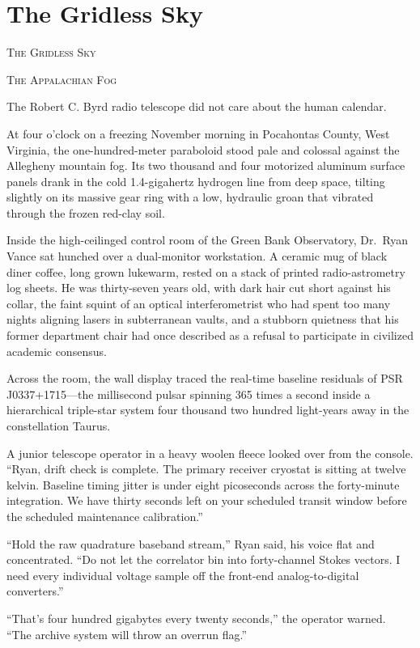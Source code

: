 \documentclass[12pt,twoside,openright]{book}
\newcommand{\sceneheader}[1]{%
  \par\vspace{1.8em}%
  {\noindent\centering\scshape\large #1\par}%
  \vspace{1.0em}%
  \noindent%
}
\begin{document}
\chapter{The Gridless Sky}
\sceneheader{The Gridless Sky}

\sceneheader{The Appalachian Fog}

The Robert C. Byrd radio telescope did not care about the human
calendar.

At four o'clock on a freezing November morning in Pocahontas County,
West Virginia, the one-hundred-meter paraboloid stood pale and colossal
against the Allegheny mountain fog. Its two thousand and four motorized
aluminum surface panels drank in the cold 1.4-gigahertz hydrogen line
from deep space, tilting slightly on its massive gear ring with a low,
hydraulic groan that vibrated through the frozen red-clay soil.

Inside the high-ceilinged control room of the Green Bank Observatory,
Dr.~Ryan Vance sat hunched over a dual-monitor workstation. A ceramic
mug of black diner coffee, long grown lukewarm, rested on a stack of
printed radio-astrometry log sheets. He was thirty-seven years old, with
dark hair cut short against his collar, the faint squint of an optical
interferometrist who had spent too many nights aligning lasers in
subterranean vaults, and a stubborn quietness that his former department
chair had once described as a refusal to participate in civilized
academic consensus.

Across the room, the wall display traced the real-time baseline
residuals of PSR J0337+1715---the millisecond pulsar spinning 365 times
a second inside a hierarchical triple-star system four thousand two
hundred light-years away in the constellation Taurus.

A junior telescope operator in a heavy woolen fleece looked over from
the console. ``Ryan, drift check is complete. The primary receiver
cryostat is sitting at twelve kelvin. Baseline timing jitter is under
eight picoseconds across the forty-minute integration. We have thirty
seconds left on your scheduled transit window before the scheduled
maintenance calibration.''

``Hold the raw quadrature baseband stream,'' Ryan said, his voice flat
and concentrated. ``Do not let the correlator bin into forty-channel
Stokes vectors. I need every individual voltage sample off the front-end
analog-to-digital converters.''

``That's four hundred gigabytes every twenty seconds,'' the operator
warned. ``The archive system will throw an overrun flag.''
\end{document}
